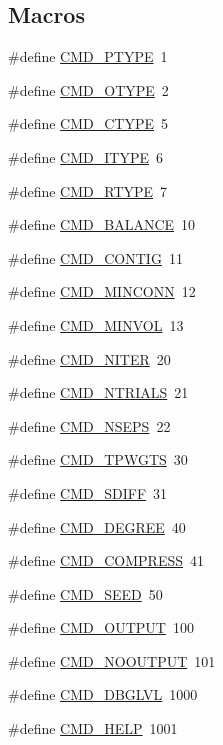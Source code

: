 \subsection*{Macros}
\begin{DoxyCompactItemize}
\item 
\#define \hyperlink{a00891_a98ea295a4e7a56fedad5f6f7988a5fe3}{C\+M\+D\+\_\+\+P\+T\+Y\+PE}~1
\item 
\#define \hyperlink{a00891_a4e50390d47077f1ead3f370080907de9}{C\+M\+D\+\_\+\+O\+T\+Y\+PE}~2
\item 
\#define \hyperlink{a00891_a349849f30c0f7b5da974b02059f3cd2f}{C\+M\+D\+\_\+\+C\+T\+Y\+PE}~5
\item 
\#define \hyperlink{a00891_ab631ca69e27033129646e2daf2a42474}{C\+M\+D\+\_\+\+I\+T\+Y\+PE}~6
\item 
\#define \hyperlink{a00891_a6c547dd5e05e5a8d6db25dd9021d60b9}{C\+M\+D\+\_\+\+R\+T\+Y\+PE}~7
\item 
\#define \hyperlink{a00891_a2e867f05995b5f560894575b833dfff6}{C\+M\+D\+\_\+\+B\+A\+L\+A\+N\+CE}~10
\item 
\#define \hyperlink{a00891_a692fe5d5df87eb3754e6ef9b29e0b758}{C\+M\+D\+\_\+\+C\+O\+N\+T\+IG}~11
\item 
\#define \hyperlink{a00891_a2ffda57f120ba2cf1328bb9f6b686503}{C\+M\+D\+\_\+\+M\+I\+N\+C\+O\+NN}~12
\item 
\#define \hyperlink{a00891_a8782f010b65ded4db1b1598fa3fbc299}{C\+M\+D\+\_\+\+M\+I\+N\+V\+OL}~13
\item 
\#define \hyperlink{a00891_a26e9eb9179a727d896d5524a20dd80fd}{C\+M\+D\+\_\+\+N\+I\+T\+ER}~20
\item 
\#define \hyperlink{a00891_a2d8b789e171ac7305ccaeda8b8a2e5ff}{C\+M\+D\+\_\+\+N\+T\+R\+I\+A\+LS}~21
\item 
\#define \hyperlink{a00891_a681e56ccdb0fdf91a3228998f083b358}{C\+M\+D\+\_\+\+N\+S\+E\+PS}~22
\item 
\#define \hyperlink{a00891_a144945e1c88b8da84e63dc3686e4a87f}{C\+M\+D\+\_\+\+T\+P\+W\+G\+TS}~30
\item 
\#define \hyperlink{a00891_ad21a4651fb1bb8654a3195a6227f64c5}{C\+M\+D\+\_\+\+S\+D\+I\+FF}~31
\item 
\#define \hyperlink{a00891_a93d3094be6af757ba67700f53b595fe3}{C\+M\+D\+\_\+\+D\+E\+G\+R\+EE}~40
\item 
\#define \hyperlink{a00891_a7ede216f94f96916339c221b7d98a050}{C\+M\+D\+\_\+\+C\+O\+M\+P\+R\+E\+SS}~41
\item 
\#define \hyperlink{a00891_a17e130385cc8686ebb548ec905f7d386}{C\+M\+D\+\_\+\+S\+E\+ED}~50
\item 
\#define \hyperlink{a00891_a5d370de77361877089173c3c0acd87da}{C\+M\+D\+\_\+\+O\+U\+T\+P\+UT}~100
\item 
\#define \hyperlink{a00891_a880e139752d20d33934c216a41ca14af}{C\+M\+D\+\_\+\+N\+O\+O\+U\+T\+P\+UT}~101
\item 
\#define \hyperlink{a00891_a067da79fcf380ed6feca48d893f6aaeb}{C\+M\+D\+\_\+\+D\+B\+G\+L\+VL}~1000
\item 
\#define \hyperlink{a00891_a42553adbbb23a03ca876697c00ea44b1}{C\+M\+D\+\_\+\+H\+E\+LP}~1001
\end{DoxyCompactItemize}


